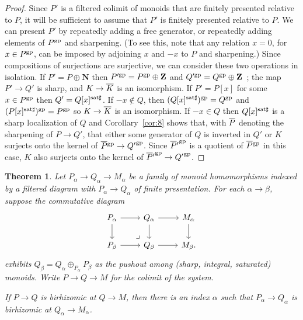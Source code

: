 \documentclass[10pt]{article}
\numberwithin{equation}{section}
\newtheorem{theorem}[paragraph]{Theorem}
\theoremstyle{definition}
\theoremstyle{remark}
\newcommand{\gp}[1]{#1^{\rm gp}}
\renewcommand{\bar}[1]{\overnorm{#1}\vphantom{#1}}
\def\overnorm#1{\overline{#1}\vphantom{#1}}
\begin{document}
\begin{proof}
	Since $P'$ is a filtered colimit of monoids that are finitely presented relative to $P$, 
	it will be sufficient to assume that $P'$ is finitely presented relative to $P$.  We can present $P'$ by repeatedly adding a free generator, or repeatedly adding elements of $\gp P$ and sharpening.  (To see this, note that any relation $x = 0$, for $x \in \gp P$, can be imposed by adjoining $x$ and $-x$ to $P$ and sharpening.)  Since compositions of surjections are surjective, we can consider these two operations in isolation.  If $P' = P \oplus \mathbf N$ then $\gp{P'} = \gp P \oplus \mathbf Z$ and $\gp{Q'} = \gp Q \oplus \mathbf Z$~; the map $P' \to Q'$ is sharp, and $K \to \bar K$ is an isomorphism.  If $P' = P[x]$ for some $x \in \gp P$ then $Q' = Q[x]^{{\rm sat}\sharp}$.  If $-x \not\in Q$, then $(Q[x]^{{\rm sat}\sharp})^{\rm gp} = Q^{\rm gp}$ and $(P[x]^{\rm sat\sharp})^{\rm gp} = P^{\rm gp}$ so $K \to \bar K$ is an isomorphism.  If $-x \in Q$ then $Q[x]^{{\rm sat}\sharp}$ is a sharp localization of $Q$ and Corollary~\ref{cor:8} shows that, with $\bar P$ denoting the sharpening of $P \to Q'$, that either some generator of $Q$ is inverted in $Q'$ or $K$ surjects onto the kernel of $\bar P^{\rm gp} \to {Q'}^{\rm gp}$.  Since ${\bar P'}^{\rm gp}$ is a quotient of $\bar P^{\rm gp}$ in this case, $K$ also surjects onto the kernel of ${\bar P'}^{\rm gp} \to {Q'}^{\rm gp}$.
\end{proof}





\begin{theorem}\label{thm:noethapprox}
	Let $P_\alpha \to Q_\alpha \to M_\alpha$ be a family of monoid homomorphisms indexed by a filtered diagram with $P_\alpha \to Q_\alpha$ of finite presentation. For each $\alpha \to \beta$, suppose the commutative diagram 
	\[
	\begin{tikzcd}
		P_\alpha \ar[r] \ar[d] \ar[dr, phantom, very near end, "\lrcorner"] 		&Q_\alpha \ar[r] \ar[d] 		&M_\alpha \ar[d] 		\\
		P_\beta \ar[r]			&Q_\beta \ar[r]		&M_\beta.
	\end{tikzcd}
	\]
	exhibits $Q_\beta = Q_\alpha \oplus_{P_\alpha} P_\beta$ as the pushout among (sharp, integral, saturated) monoids. Write $P \to Q \to M$ for the colimit of the system. 

	If $P \to Q$ is birhizomic at $Q \to M$, then there is an index $\alpha$ such that $P_\alpha \to Q_\alpha$ is birhizomic at $Q_\alpha \to M_\alpha$. 
\end{theorem}
\end{document}
